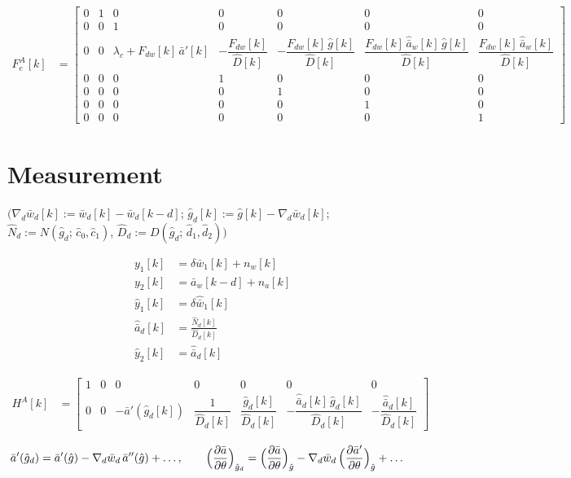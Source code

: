 \documentclass[11pt,a4paper,fontset=none]{ctexart}
\newcommand{\ba}{\bar{a}}
\newcommand{\bw}{\bar{w}}
\newcommand{\ap}{\ba'}
\newcommand{\app}{\ba''}
\newcommand{\ah}{\hat{\ba}_w}
\newcommand{\ad}{\hat{\ba}_d}
\newcommand{\gh}{\hat g}
\newcommand{\gd}{\hat g_d}
\newcommand{\Nh}{\hat N}
\newcommand{\Dh}{\hat D}
\begin{document}
{\footnotesize\setlength{\arraycolsep}{2pt}
\begin{align*}
F_e^{A}[k] &= \begin{bmatrix}
0 & 1 & 0 & 0 & 0 & 0 & 0 \\
0 & 0 & 1 & 0 & 0 & 0 & 0 \\
0 & 0 & \lambda_c + F_{dw}[k]\,\ap[k]
      & -\dfrac{F_{dw}[k]}{\Dh[k]}
      & -\dfrac{F_{dw}[k]\,\gh[k]}{\Dh[k]}
      & \dfrac{F_{dw}[k]\,\ah[k]\,\gh[k]}{\Dh[k]}
      & \dfrac{F_{dw}[k]\,\ah[k]}{\Dh[k]} \\
0 & 0 & 0 & 1 & 0 & 0 & 0 \\
0 & 0 & 0 & 0 & 1 & 0 & 0 \\
0 & 0 & 0 & 0 & 0 & 1 & 0 \\
0 & 0 & 0 & 0 & 0 & 0 & 1
\end{bmatrix}
\end{align*}}

\section{Measurement}

$\bigl(\nabla_d\bw_d[k] := \bw_d[k] - \bw_d[k-d]$; $\gd[k] := \gh[k] - \nabla_d\bw_d[k]$;
$\Nh_d := N(\gd;\,\hat c_0, \hat c_1)$, $\Dh_d := D(\gd;\,\hat d_1, \hat d_2)\bigr)$

\begin{align*}
y_1[k]      &= \delta\bw_1[k] + n_w[k] \\
y_2[k]      &= \ba_w[k-d] + n_a[k] \\
\hat y_1[k] &= \delta\hat{\bw}_1[k] \\
\ad[k]      &= \frac{\Nh_d[k]}{\Dh_d[k]} \\
\hat y_2[k] &= \ad[k]
\end{align*}

{\footnotesize\setlength{\arraycolsep}{3pt}
\begin{align*}
H^{A}[k]    &= \begin{bmatrix} 1 & 0 & 0 & 0 & 0 & 0 & 0 \\[4pt]
               0 & 0 & -\ap(\gd[k])
                     & \dfrac{1}{\Dh_d[k]}
                     & \dfrac{\gd[k]}{\Dh_d[k]}
                     & -\dfrac{\ad[k]\,\gd[k]}{\Dh_d[k]}
                     & -\dfrac{\ad[k]}{\Dh_d[k]} \end{bmatrix}
\end{align*}}

\begin{align*}
\ap(\gd) &= \ap(\gh) - \nabla_d\bw_d\,\app(\gh) + \dots, \qquad
\Bigl(\frac{\partial\ba}{\partial\theta}\Bigr)_{\gd} = \Bigl(\frac{\partial\ba}{\partial\theta}\Bigr)_{\gh}
   - \nabla_d\bw_d\,\Bigl(\frac{\partial\ap}{\partial\theta}\Bigr)_{\gh} + \dots
\end{align*}
\end{document}
